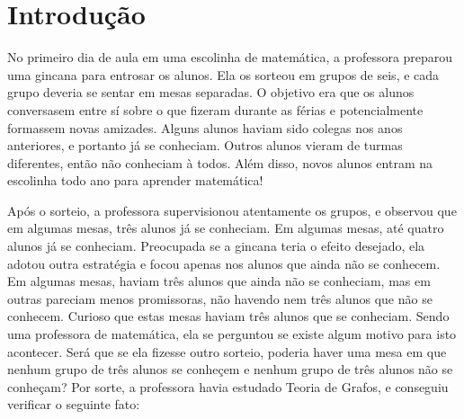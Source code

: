 
\chapter{Introdução}

No primeiro dia de aula em uma escolinha de matemática, a professora preparou uma gincana para entrosar os alunos. Ela os sorteou em grupos de seis, e cada grupo deveria se sentar em mesas separadas. O objetivo era que os alunos conversasem entre sí sobre o que fizeram durante as férias e potencialmente formassem novas amizades. Alguns alunos haviam sido colegas nos anos anteriores, e portanto já se conheciam. Outros alunos vieram de turmas diferentes, então não conheciam à todos. Além disso, novos alunos entram na escolinha todo ano para aprender matemática!

Após o sorteio, a professora supervisionou atentamente os grupos, e observou que em algumas mesas, três alunos já se conheciam. Em algumas mesas, até quatro alunos já se conheciam. Preocupada se a gincana teria o efeito desejado, ela adotou outra estratégia e focou apenas nos alunos que ainda não se conhecem. Em algumas mesas, haviam três alunos que ainda não se conheciam, mas em outras pareciam menos promissoras, não havendo nem três alunos que não se conhecem. Curioso que estas mesas haviam três alunos que se conheciam. Sendo uma professora de matemática, ela se perguntou se existe algum motivo para isto acontecer. Será que se ela fizesse outro sorteio, poderia haver uma mesa em que nenhum grupo de três alunos se conheçem e nenhum grupo de três alunos não se conheçam? Por sorte, a professora havia estudado Teoria de Grafos, e conseguiu verificar o seguinte fato:


